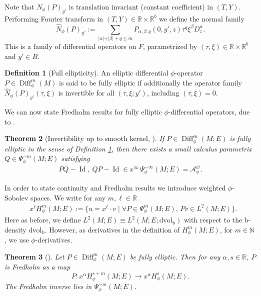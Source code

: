 \documentclass[JEP,XML,SOM,Unicode,NoFloatCountersInSection,published]{cedram}
\theoremstyle{plain}
\newtheorem{Th}{Theorem}[section]
\theoremstyle{definition}
\newtheorem{defn}[Th]{Definition}
\newcommand {\N}{\mathbb{N}}
\newcommand{\R}{{\mathbb{R}}}
\newcommand\calA{{\mathcal A}}
\newcommand{\bb}{{\mathrm{b}}}
\newcommand{\dvol}{\mathrm{dvol}}
\DeclareMathOperator{\Diff}{Diff}
\DeclareMathOperator{\Id}{Id}
\begin{document}
Note that $N_{\phi}(P)_{y'}$ is translation invariant (constant coefficient) in $(T,Y)$.
Performing Fourier transform in $(T,Y) \in \R \times \R^b$ we define the normal family
\begin{equation}\label{normal-family}
\widehat{N}_{\phi}(P)_{y'} :=
\sum_{\vert \alpha \vert + \vert \beta \vert + q \leq m}
P_{\alpha,\beta,q}(0,y',z) \tau^q \xi^\beta D_{z}^{\alpha}.
\end{equation}
This is a family of differential operators on $F$, parametrized by
$(\tau, \xi) \in \R \times \R^b$ and $y'\in B$.
\begin{defn}[Full ellipticity] \label{full ellipticity}
An elliptic differential $\phi$-operator $P \in \Diff_{\phi}^{m}(M)$ is said to be fully elliptic
if additionally the operator family $\widehat{N}_{\phi}(P)_{y'}(\tau, \xi)$
is invertible for all $(\tau, \xi; y')$, including $(\tau, \xi) = 0$.
\end{defn}

We can now state Fredholm results for fully elliptic $\phi$-differential
operators, due to \cite{mazzeo1998pseudodifferential}.

\skpt
\begin{Th}[Invertibility up to smooth kernel, {\cite[Prop.\,8]{mazzeo1998pseudodifferential}}]
\label{invphi}
If $ P \in\Diff^{m}_{\phi}(M; E)$ is fully elliptic
in the sense of Definition \ref{full ellipticity}, then there exists a small calculus parametrix $Q \in \Psi_{\phi}^{-m}(M;E)$
satisfying
\begin{align*}
P Q - \Id,\ Q P - \Id \in x^\infty\,\Psi_\phi^{-\infty}(M;E) = \calA_\phi^\varnothing.
\end{align*}
\end{Th}

In order to state continuity and Fredholm results we introduce weighted $\phi$-Sobolev spaces. We write
for any $m, \ell \in \R$
\begin{align*}
&x^{\ell}H^{m}_{\phi}(M;E) := \{ u = x^{\ell} \cdot v \mid \forall P \in \Psi_{\phi}^{m}(M;E),\,Pv \in L^{2}(M;E) \}.
\end{align*}
Here as before, we define $L^2(M;E) \equiv L^2(M; E; \dvol_\bb)$ with respect to the b-density $\dvol_\bb$. However, as derivatives in the definition of $H^m_\phi(M;E)$, \eg for $m\in\N$, we use $\phi$-derivatives.

\begin{Th}[{\cite[Prop.\,9,\,10]{mazzeo1998pseudodifferential}}]
Let $P\in \Diff^m_\phi(M; E)$ be fully elliptic. Then for any $\alpha, s\in\R$, $P$ is Fredholm as a map
\[
P: x^\alpha H^{s+m}_\phi(M; E) \to x^{\alpha}H^{s}_\phi(M; E).
\]
The Fredholm inverse lies in $\Psi_{\phi}^{-m}(M;E)$.
\end{Th}
\end{document}
